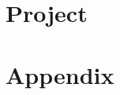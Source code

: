\documentclass[openany, twoside] {memoir}
\begin{document}
	
	




\setcounter{tocdepth}{1}

\tableofcontents 

\listoftables

\listoffigures

\mainmatter


\part{Project}




\part{Appendix}
\appendix

%





\printindex
\end{document}
